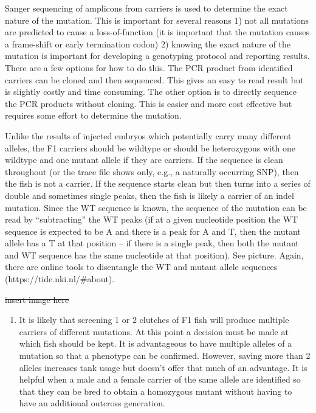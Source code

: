 \documentclass[
  letterpaper,
  DIV=11,
  numbers=noendperiod]{scrreprt}
\providecommand{\tightlist}{%
  \setlength{\itemsep}{0pt}\setlength{\parskip}{0pt}}\usepackage{longtable,booktabs,array}
\begin{document}
\begin{tcolorbox}
\begin{enumerate}
  Sanger sequencing of amplicons from carriers is used to determine the
  exact nature of the mutation. This is important for several reasons 1)
  not all mutations are predicted to cause a loss-of-function (it is
  important that the mutation causes a frame-shift or early termination
  codon) 2) knowing the exact nature of the mutation is important for
  developing a genotyping protocol and reporting results. There are a
  few options for how to do this. The PCR product from identified
  carriers can be cloned and then sequenced. This gives an easy to read
  result but is slightly costly and time consuming. The other option is
  to directly sequence the PCR products without cloning. This is easier
  and more cost effective but requires some effort to determine the
  mutation.
\end{enumerate}

Unlike the results of injected embryos which potentially carry many
different alleles, the F1 carriers should be wildtype or should be
heterozygous with one wildtype and one mutant allele if they are
carriers. If the sequence is clean throughout (or the trace file shows
only, e.g., a naturally occurring SNP), then the fish is not a carrier.
If the sequence starts clean but then turns into a series of double and
sometimes single peaks, then the fish is likely a carrier of an indel
mutation. Since the WT sequence is known, the sequence of the mutation
can be read by ``subtracting'' the WT peaks (if at a given nucleotide
position the WT sequence is expected to be A and there is a peak for A
and T, then the mutant allele has a T at that position -- if there is a
single peak, then both the mutant and WT sequence has the same
nucleotide at that position). See picture. Again, there are online tools
to disentangle the WT and mutant allele sequences
(https://tide.nki.nl/\#about).

\st{insert image here}

\begin{enumerate}
\def\labelenumi{\arabic{enumi}.}
\setcounter{enumi}{5}
\tightlist
\item
  It is likely that screening 1 or 2 clutches of F1 fish will produce
  multiple carriers of different mutations. At this point a decision
  must be made at which fish should be kept. It is advantageous to have
  multiple alleles of a mutation so that a phenotype can be confirmed.
  However, saving more than 2 alleles increases tank usage but doesn't
  offer that much of an advantage. It is helpful when a male and a
  female carrier of the same allele are identified so that they can be
  bred to obtain a homozygous mutant without having to have an
  additional outcross generation.
\end{enumerate}

\end{tcolorbox}
\end{document}
